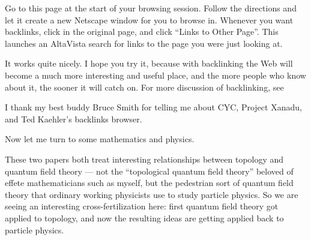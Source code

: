 \documentclass{article}
\renewcommand{\texttt}[1]{%
  \begingroup
  \ttfamily
  \begingroup\lccode`~=`/\lowercase{\endgroup\def~}{/\discretionary{}{}{}}%
  \begingroup\lccode`~=`[\lowercase{\endgroup\def~}{[\discretionary{}{}{}}%
  \begingroup\lccode`~=`.\lowercase{\endgroup\def~}{.\discretionary{}{}{}}%
  \catcode`/=\active\catcode`[=\active\catcode`.=\active
  \scantokens{#1\noexpand}%
  \endgroup
}
\begin{document}
Go to this page at the start of your browsing session. Follow the
directions and let it create a new Netscape window for you to browse in.
Whenever you want backlinks, click in the original page, and click
``Links to Other Page''. This launches an AltaVista search for links to
the page you were just looking at.

It works quite nicely. I hope you try it, because with backlinking the
Web will become a much more interesting and useful place, and the more
people who know about it, the sooner it will catch on. For more
discussion of backlinking, see


I thank my best buddy Bruce Smith for telling me about CYC, Project
Xanadu, and Ted Kaehler's backlinks browser.

Now let me turn to some mathematics and physics.


These two papers both treat interesting relationships between topology
and quantum field theory --- not the ``topological quantum field
theory'' beloved of effete mathematicians such as myself, but the
pedestrian sort of quantum field theory that ordinary working physicists
use to study particle physics. So we are seeing an interesting
cross-fertilization here: first quantum field theory got applied to
topology, and now the resulting ideas are getting applied back to
particle physics.
\end{document}
